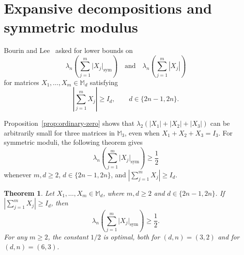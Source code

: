 \documentclass[11pt]{amsart}
\numberwithin{equation}{section}
\newtheorem{theorem}{Theorem}[section]
\newcommand{\smod}[1]{\lvert #1\rvert_{\mathrm{sym}}}
\begin{document}
\section{Expansive decompositions and symmetric modulus}
\label{sec:expansive}

Bourin and Lee~\cite[Question~6.3]{BourinLee2026} asked for
lower bounds on
\[
 \lambda_n\left(\sum_{j=1}^m\smod{X_j}\right)
 \quad\text{and}\quad
 \lambda_n\left(\sum_{j=1}^m|X_j|\right)
\]
for matrices $X_1,\ldots,X_m\in\mathbb M_d$ satisfying
\[
 \left|\sum_{j=1}^mX_j\right|\geq I_d,
 \qquad d\in\{2n-1,2n\}.
\]

Proposition~\ref{prop:ordinary-zero} shows that
$\lambda_2(|X_1|+|X_2|+|X_3|)$ can be arbitrarily small
for three matrices in $\mathbb M_3$, even when
$X_1+X_2+X_3=I_3$.
For symmetric moduli, the following theorem gives
\[
 \lambda_n\left(\sum_{j=1}^m\smod{X_j}\right)\geq\frac12
\]
whenever $m,d\geq2$,
$d\in\{2n-1,2n\}$, and
$\left|\sum_{j=1}^mX_j\right|\geq I_d$.

\begin{theorem}\label{thm:sym-lower}
Let $X_1,\ldots,X_m\in\mathbb M_d$, where $m,d\geq2$
and $d\in\{2n-1,2n\}$. If
$\left|\sum_{j=1}^mX_j\right|\geq I_d$, then
\begin{equation}\label{eq:sym-lower}
 \lambda_n\left(\sum_{j=1}^m\smod{X_j}\right)\geq\frac12.
\end{equation}
For   any $m\ge2$, the constant $1/2$ is optimal, both for $(d,n)=(3,2)$ and  for $(d,n)=(6,3)$.
\end{theorem}
\end{document}
